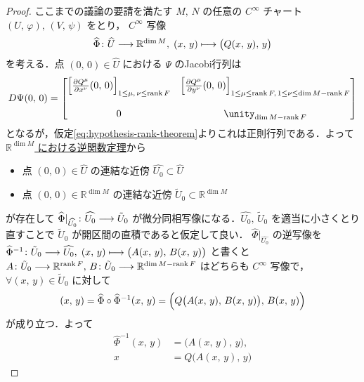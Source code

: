 \documentclass[geometry_main]{subfiles}
\begin{document}
\begin{proof}
    ここまでの議論の要請を満たす $M,\, N$ の任意の $C^\infty$ チャート $(U,\, \varphi),\, (V,\, \psi)$ をとり， 
    $C^\infty$ 写像
    \begin{align}
        \widehat{\Phi} \colon \widehat{U} \longrightarrow \mathbb{R}^{\dim M},\; (x,\, y) \longmapsto \bigl( Q(x,\, y),\, y \bigr) 
    \end{align}
    を考える．点 $(0,\, 0) \in \widehat{U}$ における $\Psi$ のJacobi行列は
    \begin{align}
        D\Psi(0,\, 0) = 
        \mqty[
            \left[\pdv{Q^\mu}{x^\nu}()(0,\, 0)\right]_{1 \le \mu,\, \nu \le \rank F} & \left[\pdv{Q^\mu}{y^\nu}()(0,\, 0)\right]_{1 \le \mu \le \rank F,\, 1 \le \nu \le \dim M - \rank F} \\ 
            & \\
            0 & \unity_{\dim M - \rank F}
        ]
    \end{align}
    となるが，仮定\eqref{eq:hypothesis-rank-theorem}よりこれは正則行列である．よって\hyperref[thm:inverse-function-Rn]{$\mathbb{R}^{\dim M}$ における逆関数定理}から
    \begin{itemize}
        \item 点 $(0,\, 0) \in \widehat{U}$ の連結な近傍 $\widehat{U_0} \subset \widehat{U}$
        \item 点 $(0,\, 0) \in \mathbb{R}^{\dim M}$ の連結な近傍 $\tilde{U}_0 \subset \mathbb{R}^{\dim M}$
    \end{itemize}
    が存在して $\widehat{\Phi}|_{\widehat{U_0}} \colon \widehat{U_0} \longrightarrow \tilde{U}_0$ が微分同相写像になる．$\widehat{U_0},\, \tilde{U}_0$ を適当に小さくとり直すことで $\tilde{U}_0$ が開区間の直積であると仮定して良い．
    $\widehat{\Phi}|_{\widehat{U_0}}$ の逆写像を $\widehat{\Phi}^{-1} \colon \tilde{U}_0 \longrightarrow \widehat{U_0},\; (x,\, y) \longmapsto \bigl( A(x,\, y),\, B(x,\, y) \bigr)$ と書くと $A \colon \tilde{U}_0 \longrightarrow \mathbb{R}^{\rank F},\, B \colon \tilde{U}_0 \longrightarrow \mathbb{R}^{\dim M -\rank F}$ はどちらも $C^\infty$ 写像で，
    $\forall (x,\, y) \in \tilde{U}_0$ に対して
    \begin{align}
        (x,\, y) 
        = \widehat{\Phi} \circ \widehat{\Phi}^{-1}(x,\, y)
        = \Bigl( Q \bigl( A(x,\, y),\, B(x,\, y) \bigr),\, B(x,\, y)  \Bigr)
    \end{align}
    が成り立つ．よって
    \begin{align}
        \widehat{\Phi}^{-1}(x,\, y) &= \bigl( A(x,\, y),\, y \bigr) , \\
        x &= Q \bigl( A(x,\, y),\, y \bigr) 
    \end{align}

\end{proof}
\end{document}
